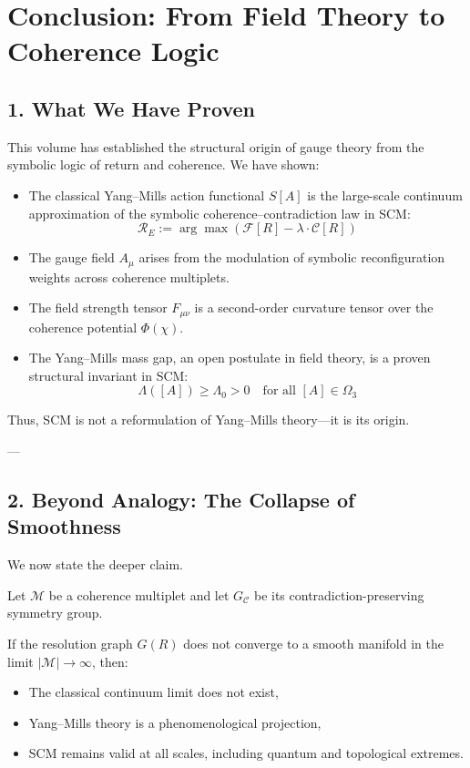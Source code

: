 \chapter{Conclusion: From Field Theory to Coherence Logic} \label{chapter-gauge-conclusion}

\section{1. What We Have Proven} \label{sec:gauge-proof-summary}

This volume has established the structural origin of gauge theory from the symbolic logic of return and coherence. We have shown:

\begin{itemize}
  \item The classical Yang–Mills action functional $S[A]$ is the large-scale continuum approximation of the symbolic coherence–contradiction law in SCM:
  \[
  \mathcal{R}_E := \arg\max(\mathcal{F}[R] - \lambda \cdot \mathcal{C}[R])
  \]
  \item The gauge field $A_\mu$ arises from the modulation of symbolic reconfiguration weights across coherence multiplets.
  \item The field strength tensor $F_{\mu\nu}$ is a second-order curvature tensor over the coherence potential $\Phi(\chi)$.
  \item The Yang–Mills mass gap, an open postulate in field theory, is a proven structural invariant in SCM:
  \[
  \Lambda([A]) \geq \Lambda_0 > 0 \quad \text{for all } [A] \in \Omega_3
  \]
\end{itemize}

Thus, SCM is not a reformulation of Yang–Mills theory—it is its origin.

---

\section{2. Beyond Analogy: The Collapse of Smoothness} \label{sec:smooth-collapse}

We now state the deeper claim.

\begin{definition}
Let $\mathcal{M}$ be a coherence multiplet and let $G_\mathcal{C}$ be its contradiction-preserving symmetry group.

If the resolution graph $G(R)$ does not converge to a smooth manifold in the limit $|\mathcal{M}| \to \infty$, then:

\begin{itemize}
  \item The classical continuum limit does not exist,
  \item Yang–Mills theory is a phenomenological projection,
  \item SCM remains valid at all scales, including quantum and topological extremes.
\end{itemize}
\end{definition}

